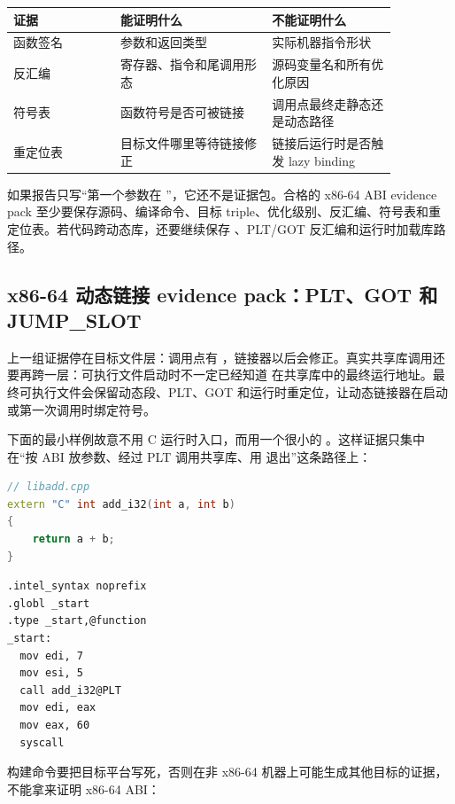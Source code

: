 \begin{center}
\begin{tabular}{p{0.24\linewidth}p{0.34\linewidth}p{0.28\linewidth}}
\toprule
证据 & 能证明什么 & 不能证明什么 \\
\midrule
函数签名 & 参数和返回类型 & 实际机器指令形状 \\
反汇编 & 寄存器、指令和尾调用形态 & 源码变量名和所有优化原因 \\
符号表 & 函数符号是否可被链接 & 调用点最终走静态还是动态路径 \\
重定位表 & 目标文件哪里等待链接修正 & 链接后运行时是否触发 lazy binding \\
\bottomrule
\end{tabular}
\end{center}

如果报告只写“第一个参数在 ”，它还不是证据包。合格的 x86-64 ABI evidence pack 至少要保存源码、编译命令、目标 triple、优化级别、反汇编、符号表和重定位表。若代码跨动态库，还要继续保存 、PLT/GOT 反汇编和运行时加载库路径。

\subsection{x86-64 动态链接 evidence pack：PLT、GOT 和 JUMP\_SLOT}

上一组证据停在目标文件层：调用点有 ，链接器以后会修正。真实共享库调用还要再跨一层：可执行文件启动时不一定已经知道  在共享库中的最终运行地址。最终可执行文件会保留动态段、PLT、GOT 和运行时重定位，让动态链接器在启动或第一次调用时绑定符号。

下面的最小样例故意不用 C 运行时入口，而用一个很小的 。这样证据只集中在“按 ABI 放参数、经过 PLT 调用共享库、用  退出”这条路径上：

\begin{lstlisting}[language=C++,caption={共享库导出的函数}]
// libadd.cpp
extern "C" int add_i32(int a, int b)
{
    return a + b;
}
\end{lstlisting}

\begin{lstlisting}[numbers=none,caption={x86-64 \_start 调用共享库函数}]
.intel_syntax noprefix
.globl _start
.type _start,@function
_start:
  mov edi, 7
  mov esi, 5
  call add_i32@PLT
  mov edi, eax
  mov eax, 60
  syscall
\end{lstlisting}

构建命令要把目标平台写死，否则在非 x86-64 机器上可能生成其他目标的证据，不能拿来证明 x86-64 ABI：

